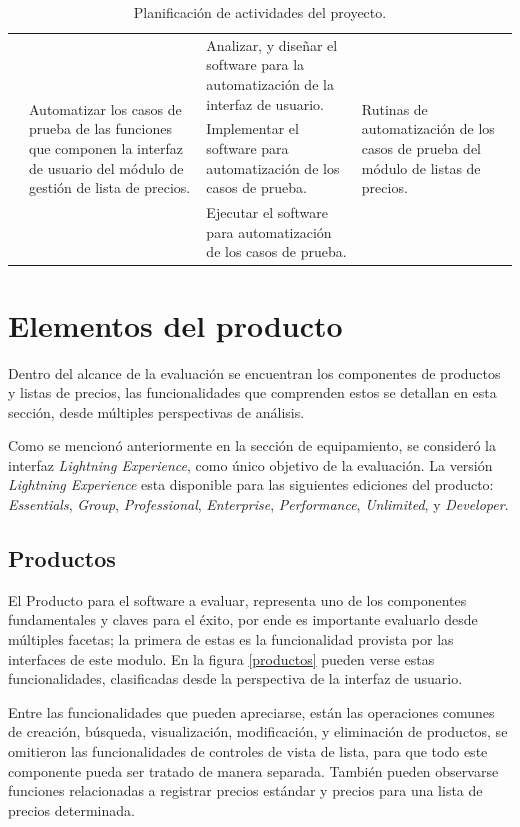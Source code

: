 \begin{table}
{\begin{tabular}{|l|l|p{6.5cm}|l|}
& \multirow{3}{4.0cm}{Automatizar los casos de prueba de las funciones que
componen la interfaz de usuario del módulo de gestión de lista de precios.} &
Analizar, y diseñar el software para la automatización de la interfaz de
usuario. &
\multirow{3}{4.0cm}{Rutinas de automatización de los casos de prueba del módulo
de listas de precios.} \\
\cline{3-3}
& & Implementar el software para automatización de los casos de prueba. & \\
\cline{3-3}
& & Ejecutar el software para automatización de los casos de prueba. & \\
\hline
\end{tabular}}
\caption{Planificación de actividades del proyecto.}
\label{planificacion}
\end{table}

\section{Elementos del producto}
Dentro del alcance de la evaluación se encuentran los componentes de productos
y listas de precios, las funcionalidades que comprenden estos se detallan en
esta sección, desde múltiples perspectivas de análisis.

Como se mencionó anteriormente en la sección de equipamiento, se consideró la
interfaz \emph{Lightning Experience}, como único objetivo de la evaluación. La
versión \emph{Lightning Experience} esta disponible para las siguientes
ediciones del producto: \emph{Essentials}, \emph{Group}, \emph{Professional},
\emph{Enterprise}, \emph{Performance}, \emph{Unlimited}, y \emph{Developer}.

\subsection{Productos}
El Producto para el software a evaluar, representa uno de los componentes
fundamentales y claves para el éxito, por ende es importante evaluarlo
desde múltiples facetas; la primera de estas es la funcionalidad provista por
las interfaces de este modulo. En la figura \ref{productos} pueden verse estas
funcionalidades, clasificadas desde la perspectiva de la interfaz de usuario.

Entre las funcionalidades que pueden apreciarse, están las operaciones comunes
de creación, búsqueda, visualización, modificación, y eliminación de productos,
se omitieron las funcionalidades de controles de vista de lista, para que
todo este componente pueda ser tratado de manera separada. También pueden
observarse funciones relacionadas a registrar precios estándar y precios para
una lista de precios determinada.


